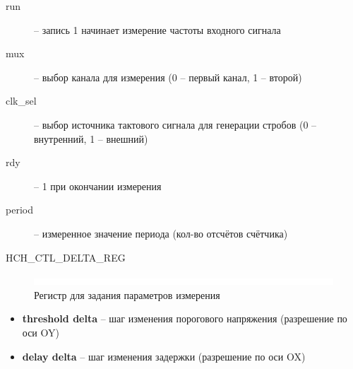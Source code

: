
\begin{description}
	\item [run] -- запись 1 начинает измерение частоты входного сигнала
	\item [mux] -- выбор канала для измерения (0 -- первый канал, 1 -- второй)
	\item [clk\_sel] -- выбор источника тактового сигнала для генерации стробов (0 -- внутренний, 1 -- внешний)
	\item [rdy] -- 1 при окончании измерения
	\item [period] -- измеренное значение периода (кол-во отсчётов счётчика)\\
\end{description}

\begin{register}{H}{CH\_CTL\_DELTA\_REG}{}%
\label{example}%
%
%
%
 \regnewline%

\end{register}


\begin{figure}[ht!] 
	\center
	\includegraphics  {my_folder/images//blank}
	\caption{Регистр для задания параметров измерения} 
	\label{fig:delta-reg}  
\end{figure}
\FloatBarrier

\noindent
\begin{itemize}[label={}]
	\item \textbf{threshold delta} -- шаг изменения порогового напряжения (разрешение по оси OY)
	\item \textbf{delay delta} -- шаг изменения задержки (разрешение по оси OX)\\
\end{itemize}


